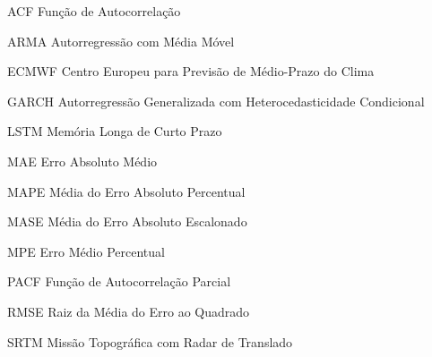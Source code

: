 \documentclass[
	12pt,				%
	openright,			%
	oneside,			%
	a4paper,			%
	english,			%
	french,				%
	spanish,			%
	brazil				%
	]{abntex2}
\begin{document}
 

  

\listoffigures*


\begin{siglas}
  \item[ACF] Função de Autocorrelação
  \item[ARMA] Autorregressão com Média Móvel
  \item[ECMWF] Centro Europeu para Previsão de Médio-Prazo do Clima
  \item[GARCH] Autorregressão Generalizada com Heterocedasticidade Condicional
  \item[LSTM] Memória Longa de Curto Prazo
  \item[MAE] Erro Absoluto Médio
  \item[MAPE] Média do Erro Absoluto Percentual
  \item[MASE] Média do Erro Absoluto Escalonado
  \item[MPE] Erro Médio Percentual
  \item[PACF] Função de Autocorrelação Parcial
  \item[RMSE] Raiz da Média do Erro ao Quadrado
  \item[SRTM] Missão Topográfica com Radar de Translado
\end{siglas}

\end{document}

